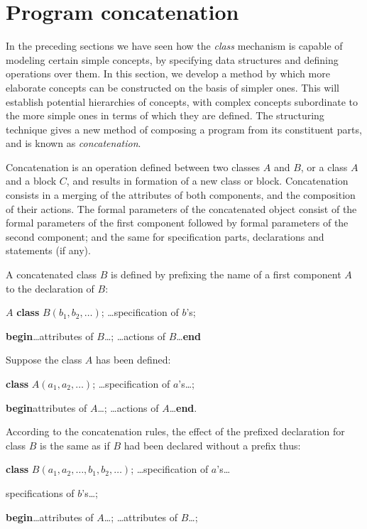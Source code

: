 \section{Program concatenation}

In the preceding sections we have seen how the \textit{class} mechanism is capable of modeling certain simple concepts, by specifying data structures and defining operations over them. In this section, we develop a method by which more elaborate concepts can be constructed on the basis of simpler ones. This will establish potential hierarchies of concepts, with complex concepts subordinate to the more simple ones in terms of which they are defined. The structuring technique gives a new method of composing a program from its constituent parts, and is known as \textit{concatenation}.

Concatenation is an operation defined between two classes $A$ and $B$, or a class $A$ and a block $C$, and results in formation of a new class or block. Concatenation consists in a merging of the attributes of both components, and the composition of their actions. The formal parameters of the concatenated object consist of the formal parameters of the first component followed by formal parameters of the second component; and the same for specification parts, declarations and statements (if any).

A concatenated class $B$ is defined by prefixing the name of a first component $A$ to the declaration of $B$:

\quad $A$ \textbf{class} $B(b_1, b_2, \dots)$; \dots specification of $b$'s;

\quad\quad \textbf{begin}\dots attributes of $B$\dots; \dots actions of $B$\dots \textbf{end}

\noindent
Suppose the class $A$ has been defined:

\quad \textbf{class} $A(a_1, a_2 , \dots)$; \dots specification of $a$'s\dots;

\quad \quad \textbf{begin}\quad attributes of $A$\dots; \dots actions of $A$\dots \textbf{end}.

According to the concatenation rules, the effect of the prefixed declaration
for class $B$ is the same as if $B$ had been declared without a prefix thus:

\quad \textbf{class} $B(a_1, a_2, \dots, b_1, b_2, \dots)$; \dots specification of $a$'s\dots

\quad \quad \quad specifications of $b$'s\dots;

\quad \quad \textbf{begin}\dots attributes of $A$\dots; \dots attributes of $B$\dots;

